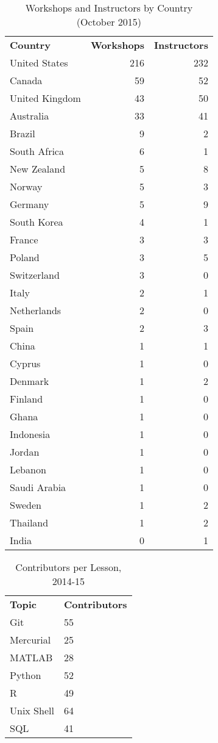 \documentclass[10pt,a4paper,twocolumn]{article}
\begin{document}
\begin{table}[h]
\begin{tabular}{lrr}
\textbf{Country} & \textbf{Workshops} & \textbf{Instructors} \\
United States & 216 & 232 \\
Canada & 59 & 52 \\
United Kingdom & 43 & 50 \\
Australia & 33 & 41 \\
Brazil & 9 & 2 \\
South Africa & 6 & 1 \\
New Zealand & 5 & 8 \\
Norway & 5 & 3 \\
Germany & 5 & 9 \\
South Korea & 4 & 1 \\
France & 3 & 3 \\
Poland & 3 & 5 \\
Switzerland & 3 & 0 \\
Italy & 2 & 1 \\
Netherlands & 2 & 0 \\
Spain & 2 & 3 \\
China & 1 & 1 \\
Cyprus & 1 & 0 \\
Denmark & 1 & 2 \\
Finland & 1 & 0 \\
Ghana & 1 & 0 \\
Indonesia & 1 & 0 \\
Jordan & 1 & 0 \\
Lebanon & 1 & 0 \\
Saudi Arabia & 1 & 0 \\
Sweden & 1 & 2 \\
Thailand & 1 & 2 \\
India & 0 & 1 \\
\end{tabular}
\caption{Workshops and Instructors by Country (October 2015)}
\label{t:by-country}
\end{table}

\begin{table}[h]
\begin{tabular}{ll}
\textbf{Topic} & \textbf{Contributors} \\
Git & 55 \\
Mercurial & 25 \\
MATLAB & 28 \\
Python & 52 \\
R & 49 \\
Unix Shell & 64 \\
SQL & 41
\end{tabular}
\caption{Contributors per Lesson, 2014-15}
\label{t:authors-per-lesson}
\end{table}

\nocite{*}
{\small
}
\end{document}
